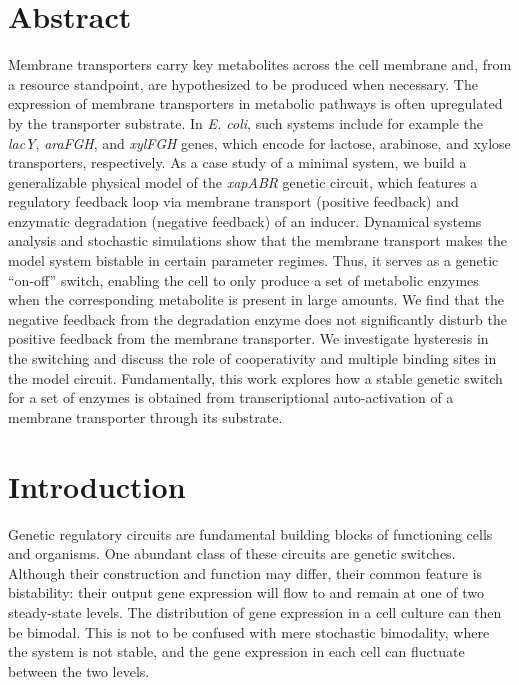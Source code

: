 \documentclass[10pt,letterpaper]{article}
\begin{document}
	\section*{Abstract}
	Membrane transporters carry key metabolites across the cell membrane
	and, from a resource standpoint, are hypothesized to be produced when necessary. The
	expression of membrane transporters in metabolic pathways is often
	upregulated by the transporter substrate. In \emph{E. coli}, such systems
	include for example the \emph{lacY}, \emph{araFGH}, and \emph{xylFGH} genes,
	which encode for lactose, arabinose, and xylose transporters, respectively.
	As a case study of a minimal system, we build a
	generalizable physical model of the \emph{xapABR} genetic
	circuit, which features a regulatory feedback loop via membrane
	transport (positive feedback) and enzymatic degradation (negative feedback)
	of an inducer. Dynamical systems analysis and stochastic simulations show
	that the membrane transport makes the model system bistable in certain
	parameter regimes. Thus, it serves as a genetic ``on-off'' switch, enabling
	the cell to only produce a set of metabolic enzymes when the corresponding
	metabolite is present in large amounts. We find that the negative feedback
	from the degradation enzyme does not significantly disturb the positive
	feedback from the membrane transporter. We investigate hysteresis in the
	switching and discuss the role of cooperativity and multiple binding sites
	in the model circuit. Fundamentally, this work explores how a stable genetic
	switch for a set of enzymes is obtained from transcriptional auto-activation
	of a membrane transporter through its substrate.
	
	\linenumbers
	
	
	\section*{Introduction} 
	Genetic regulatory circuits are fundamental building blocks of functioning
	cells and organisms. One abundant class of these circuits are genetic
	switches. Although their construction and function may differ,
	their common feature is bistability: their output gene expression
	will flow to and remain at one of two steady-state levels.
	The distribution of
	gene expression in a cell culture can then be bimodal. This is not to be
	confused with mere stochastic bimodality, where the system is not stable,
	and the gene expression in each cell can fluctuate between the two levels.
	
\end{document}
